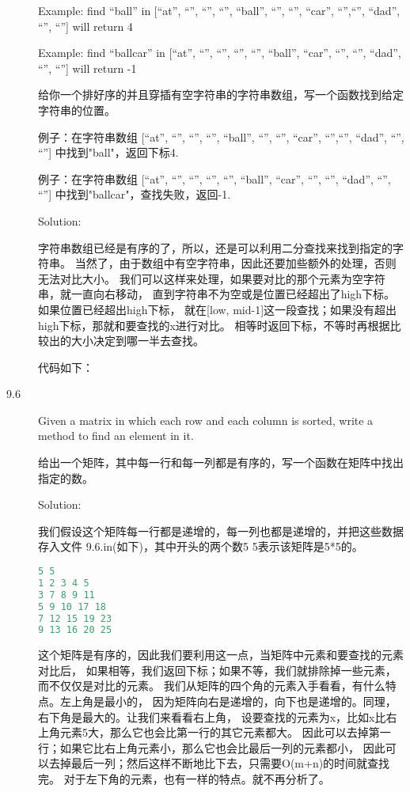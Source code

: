 \begin{description}
Example: find “ball” in [“at”, “”, “”, “”, “ball”, “”, “”, “car”, “”,“”, “dad”, “”, “”] will return 4

Example: find “ballcar” in [“at”, “”, “”, “”, “”, “ball”, “car”, “”, “”, “dad”, “”, “”] will return -1

给你一个排好序的并且穿插有空字符串的字符串数组，写一个函数找到给定字符串的位置。

例子：在字符串数组 [“at”, “”, “”, “”, “ball”, “”, “”, “car”, “”,“”, “dad”, “”, “”] 中找到"ball"，返回下标4.

例子：在字符串数组 [“at”, “”, “”, “”, “”, “ball”, “car”, “”, “”, “dad”, “”, “”] 中找到"ballcar"，查找失败，返回-1.

Solution: 

字符串数组已经是有序的了，所以，还是可以利用二分查找来找到指定的字符串。 当然了，由于数组中有空字符串，因此还要加些额外的处理，否则无法对比大小。 我们可以这样来处理，如果要对比的那个元素为空字符串，就一直向右移动， 直到字符串不为空或是位置已经超出了high下标。如果位置已经超出high下标， 就在[low, mid-1]这一段查找；如果没有超出high下标，那就和要查找的x进行对比。 相等时返回下标，不等时再根据比较出的大小决定到哪一半去查找。

代码如下：



\item[9.6] Given a matrix in which each row and each column is sorted, write a method to find an element in it.

给出一个矩阵，其中每一行和每一列都是有序的，写一个函数在矩阵中找出指定的数。

Solution: 

我们假设这个矩阵每一行都是递增的，每一列也都是递增的，并把这些数据存入文件 9.6.in(如下)，其中开头的两个数5 5表示该矩阵是5*5的。
\begin{lstlisting}[language=C++]
5 5
1 2 3 4 5
3 7 8 9 11
5 9 10 17 18
7 12 15 19 23
9 13 16 20 25
\end{lstlisting}
这个矩阵是有序的，因此我们要利用这一点，当矩阵中元素和要查找的元素对比后， 如果相等，我们返回下标；如果不等，我们就排除掉一些元素，而不仅仅是对比的元素。 我们从矩阵的四个角的元素入手看看，有什么特点。左上角是最小的， 因为矩阵向右是递增的，向下也是递增的。同理，右下角是最大的。让我们来看看右上角， 设要查找的元素为x，比如x比右上角元素5大，那么它也会比第一行的其它元素都大。 因此可以去掉第一行；如果它比右上角元素小，那么它也会比最后一列的元素都小， 因此可以去掉最后一列；然后这样不断地比下去，只需要O(m+n)的时间就查找完。 对于左下角的元素，也有一样的特点。就不再分析了。


\end{description}
